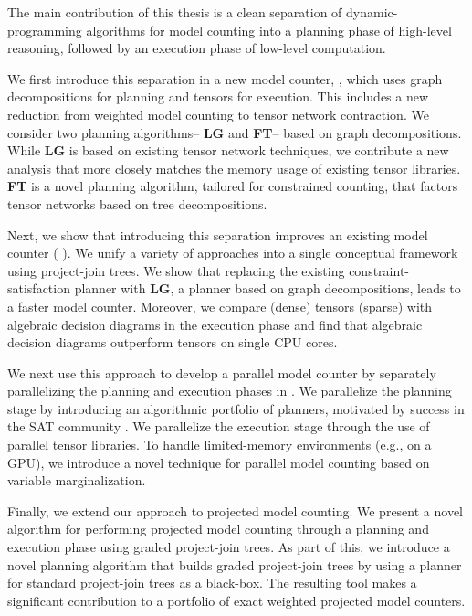 The main contribution of this thesis is a clean separation of dynamic-programming algorithms for model counting into a planning phase of high-level reasoning, followed by an execution phase of low-level computation.

We first introduce this separation in a new model counter, , which uses graph decompositions for planning and tensors for execution. This includes a new reduction from weighted model counting to tensor network contraction. We consider two planning algorithms-- \textbf{LG} and \textbf{FT}-- based on graph decompositions. While \textbf{LG} is based on existing tensor network techniques, we contribute a new analysis that more closely matches the memory usage of existing tensor libraries. \textbf{FT} is a novel planning algorithm, tailored for constrained counting, that factors tensor networks based on tree decompositions.

Next, we show that introducing this separation improves an existing model counter ( \cite{DPV20}). We unify a variety of approaches into a single conceptual framework using project-join trees. We show that replacing the existing constraint-satisfaction planner with \textbf{LG}, a planner based on graph decompositions, leads to a faster model counter. Moreover, we compare (dense) tensors (sparse) with algebraic decision diagrams in the execution phase and find that algebraic decision diagrams outperform tensors on single CPU cores.

We next use this approach to develop a parallel model counter by separately parallelizing the planning and execution phases in . We parallelize the planning stage by introducing an algorithmic portfolio of planners, motivated by success in the SAT community \cite{XHHL08}. We parallelize the execution stage through the use of parallel tensor libraries. To handle limited-memory environments (e.g., on a GPU), we introduce a novel technique for parallel model counting based on variable marginalization.

Finally, we extend our approach to projected model counting. We present a novel algorithm for performing projected model counting through a planning and execution phase using graded project-join trees. As part of this, we introduce a novel planning algorithm that builds graded project-join trees by using a planner for standard project-join trees as a black-box. The resulting tool  makes a significant contribution to a portfolio of exact weighted projected model counters.

